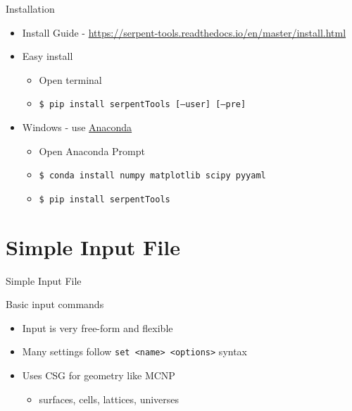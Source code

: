 \documentclass{beamer}
\begin{document}
\begin{frame}{Installation}
    \begin{itemize}
        \item Install Guide - \url{https://serpent-tools.readthedocs.io/en/master/install.html}
        \item Easy install
            \begin{itemize}
                \item Open terminal
                \item \texttt{\$ pip install serpentTools [--user] [--pre]}
            \end{itemize}
        \item Windows - use \href{https://www.anaconda.com/distribution/}{Anaconda}
            \begin{itemize}
                \item Open Anaconda Prompt
                \item \texttt{\$ conda install numpy matplotlib scipy pyyaml}
                \item \texttt{\$ pip install serpentTools}
            \end{itemize}
    \end{itemize}
\end{frame}

\section{Simple Input File}

\begin{frame}{Simple Input File}
    \tableofcontents[sectionstyle=show/hide,subsectionstyle=show/show/hide]
\end{frame}

\begin{frame}{Basic input commands}
    \begin{itemize}
        \item Input is very free-form and flexible
        \item Many settings follow \texttt{set <name> <options>} syntax
        \item Uses CSG for geometry like MCNP
        \begin{itemize}
            \item surfaces, cells, lattices, universes
        \end{itemize}
    \end{itemize}
\end{frame}
\end{document}
